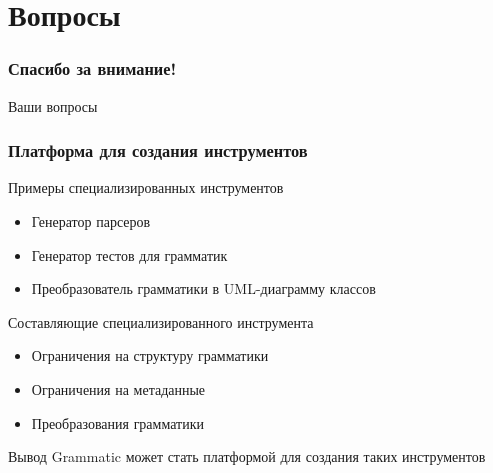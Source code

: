 \documentclass[paper=screen,10pt,unicode]{beamer}
\begin{document}
\section{Вопросы}

\begin{frame}
	\frametitle{Спасибо за внимание!}
	
	Ваши вопросы
\end{frame}


\begin{frame}
	\frametitle{Платформа для создания инструментов}

	\begin{block}{Примеры специализированных инструментов}
		\begin{itemize}
			\item Генератор парсеров
			\item Генератор тестов для грамматик
			\item Преобразователь грамматики в UML-диаграмму классов
		\end{itemize}
	\end{block}
	\begin{block}{Составляющие специализированного инструмента}
		\begin{itemize}
			\item Ограничения на структуру грамматики
			\item Ограничения на метаданные
			\item Преобразования грамматики
		\end{itemize}
	\end{block}
	\begin{block}{Вывод}
		Grammatic может стать платформой для создания таких инструментов
	\end{block}
\end{frame}
\end{document}
